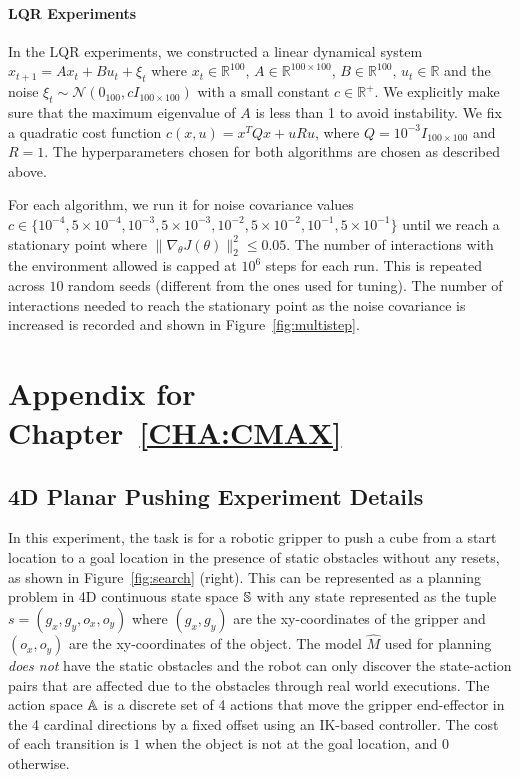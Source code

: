 \paragraph{LQR Experiments}
\label{sec:lqr-experiments}

In the LQR experiments, we constructed a linear dynamical system
$x_{t+1} = Ax_t + Bu_t + \xi_t$ where $x_t \in \mathbb{R}^{100}$, $A \in \mathbb{R}^{100\times
  100}$, $B \in \mathbb{R}^{100}$, $u_t \in
\mathbb{R}$ and the noise $\xi_t \sim \mathcal{N}(0_{100}, cI_{100
  \times 100})$ with a small constant $c \in \mathbb{R}^+$. We
explicitly make sure that the maximum eigenvalue of $A$ is less than 1
to avoid instability. We fix a quadratic cost function $c(x, u) =
x^TQx + uRu$, where $Q = 10^{-3}I_{100 \times 100}$ and $R = 1$. The
hyperparameters chosen for both algorithms are chosen as described
above.

For each algorithm, we run it for noise covariance values $c \in
\{10^{-4}, 5\times 10^{-4}, 10^{-3}, 5\times 10^{-3}, 10^{-2}, 5\times 10^{-2},
10^{-1}, 5\times 10^{-1}\}$
until we reach a stationary point where $\|\nabla_\theta
J(\theta)\|_2^2 \leq 0.05$. The number of interactions with the
environment allowed is capped at $10^6$ steps for each run. This is
repeated across $10$ random seeds (different from the ones used for
tuning). The number of interactions needed to reach the stationary
point as the noise covariance is increased is recorded and shown in
Figure~\ref{fig:multistep}.
\clearpage
\newpage
\section{Appendix for Chapter~\ref{CHA:CMAX}}
\label{sec:append-chapt-cmax}

\subsection{4D Planar Pushing Experiment Details}
\label{sec:4d-planar-pushing}

In this experiment, the task is for a robotic gripper to push a cube
from a start location to a goal location in the presence of
static obstacles without any resets, as shown in
Figure~\ref{fig:search} (right). This can be represented as a
planning problem in 4D continuous state space $\mathbb{S}$ with any state represented as
the tuple $s = (g_x,
g_y, o_x, o_y)$ where $(g_x, g_y)$ are the xy-coordinates of the
gripper and $(o_x, o_y)$ are the xy-coordinates of the object. The
model $\hat{M}$ used for planning \textit{does not} have the static obstacles and the
robot can only discover the state-action pairs that are affected due
to the obstacles through real world executions. The
action space $\mathbb{A}$ is a discrete set of 4 actions that move
the gripper end-effector in the 4 cardinal directions by a fixed
offset using an IK-based controller. The cost of each transition is
$1$ when the object is not at the goal location, and $0$
otherwise.

